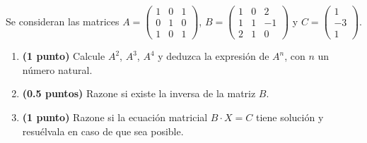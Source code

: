 
Se consideran las matrices
$A=\begin{pmatrix}1&0&1\\0&1&0\\1&0&1\end{pmatrix}$,
$B=\begin{pmatrix}1&0&2\\1&1&-1\\2&1&0\end{pmatrix}$ y
$C=\begin{pmatrix}1\\-3\\1\end{pmatrix}$.
\begin{enumerate}[label=\alph*)]
  \item \textbf{(1 punto)} Calcule $A^2$, $A^3$, $A^4$ y deduzca la
  expresión de $A^n$, con $n$ un número natural.
  \item \textbf{(0.5 puntos)} Razone si existe la inversa de la matriz $B$.
  \item \textbf{(1 punto)} Razone si la ecuación matricial $B\cdot X=C$
  tiene solución y resuélvala en caso de que sea posible.
\end{enumerate}
